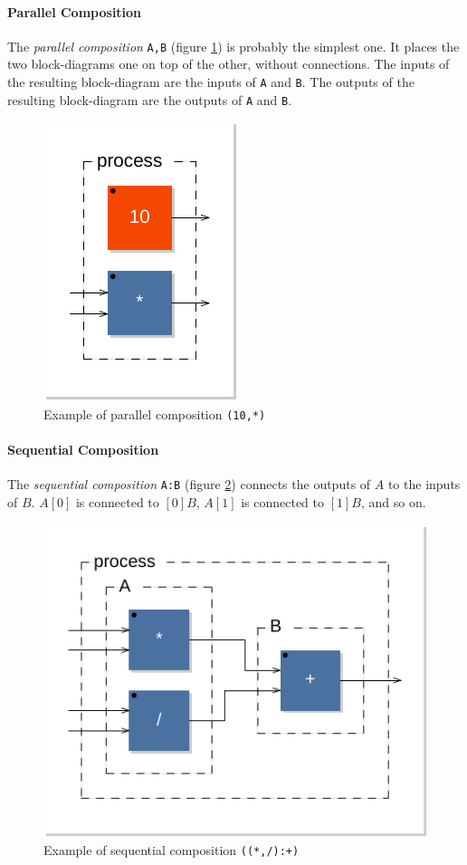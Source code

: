 \documentclass[a4paper]{book}
\begin{document}
\paragraph{Parallel Composition}
The \emph{parallel composition}  \lstinline$A,B$ (figure \ref{figure:par1}) is probably the simplest one. It places the two block-dia\-grams one on top of the other, without connections. The inputs of the resulting block-diagram are the inputs of \lstinline$A$ and \lstinline$B$. The outputs of the resulting block-diagram are the outputs of \lstinline$A$ and \lstinline$B$.

\begin{figure}[h]
\centering
\includegraphics[scale=0.7]{images/par1}
\caption{Example of parallel composition  \lstinline'(10,*)'}
\label{figure:par1}
\end{figure}


\paragraph{Sequential Composition}
The \emph{sequential composition}  \lstinline$A:B$ (figure \ref{figure:seq1}) connects the outputs of  $A$ to the inputs of  $B$.  $A[0]$ is connected to $[0]B$,   $A[1]$ is connected to $[1]B$, and so on. 

\begin{figure}[h]
\centering 
\includegraphics[scale=0.7]{images/seq1}
\caption{Example of sequential composition  \lstinline'((*,/):+)' } 
\label{figure:seq1}
\end{figure}
\end{document}

